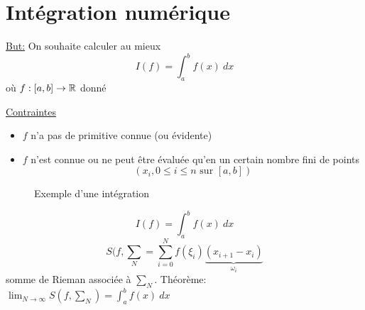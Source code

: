 \chapter{Intégration numérique}
\underline{But:} On souhaite calculer au mieux
\[
I(f) = \int_{{a}}^{{b}} {f(x)} \: d{x} {} 
\] 
où $f: [a, b] \to \mathbb{R}$ donné
\par
\underline{Contraintes}
\begin{itemize}
    \item $f$ n'a pas de primitive connue (ou évidente)
    \item  $f$ n'est connue ou ne peut être évaluée qu'en un certain nombre fini de points 
         \[
             (x_i, 0\le i \le n \text{ sur } [a, b])
        \] 
\end{itemize}

\begin{figure}[H]
    \centering
    \caption{Exemple d'une intégration}
    \label{fig:integration-exemple}
\end{figure}

\[
I(f) = \int_{{a}}^{{b}} {f(x)} \: d{x} {}
\] 
\[
    S(f, \sum_{N} = \sum_{i=0}^{N} f(\xi_i)\underbrace{(x_{i+1} - x_{i})}_{\omega_i}
\] 
somme de Rieman associée à $\sum_{N}$. Théorème: $\lim_{N \to \infty} S(f, \sum_{N}) = \int_{{a}}^{{b}} {f(x)} \: d{x} {}$

